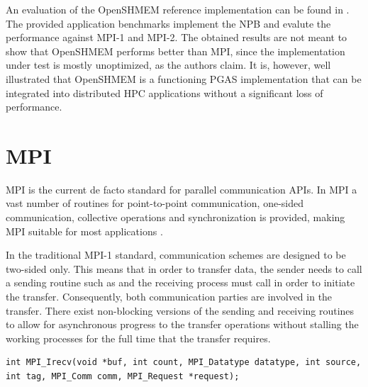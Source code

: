 An evaluation of the \ac{OpenSHMEM} reference implementation can be found in \cite{oshm-eval}. The provided application benchmarks implement the \ac{NPB} and evalute the performance against \ac{MPI}-1 and \ac{MPI}-2. The obtained results are not meant to show that \ac{OpenSHMEM} performs better than \ac{MPI}, since the implementation under test is mostly unoptimized, as the authors claim. It is, however, well illustrated that \ac{OpenSHMEM} is a functioning \ac{PGAS} implementation that can be integrated into distributed \ac{HPC} applications without a significant loss of performance.


\section{\acs{MPI}}

\Ac{MPI} is the current de facto standard for parallel communication \acp{API}. In \ac{MPI} a vast number of routines for point-to-point communication, one-sided communication, collective operations and synchronization is provided, making \ac{MPI} suitable for most applications \cite[ch.~3.3]{diss-end}.

In the traditional \ac{MPI}-1 standard, communication schemes are designed to be two-sided only. This means that in order to transfer data, the sender needs to call a sending routine such as  and the receiving process must call \eg {} in order to initiate the transfer. Consequently, both communication parties are involved in the transfer. There exist non-blocking versions of the sending and receiving routines to allow for asynchronous progress to the transfer operations without stalling the working processes for the full time that the transfer requires.

\begin{lstlisting}[style=cpp,captionpos={b},caption={Function definition of \code{MPI\_Irecv} {\cite[p.~51]{mpi3-std}}.},label=lst:background:mpi-irecv]
int MPI_Irecv(void *buf, int count, MPI_Datatype datatype, int source, int tag, MPI_Comm comm, MPI_Request *request);
\end{lstlisting}

